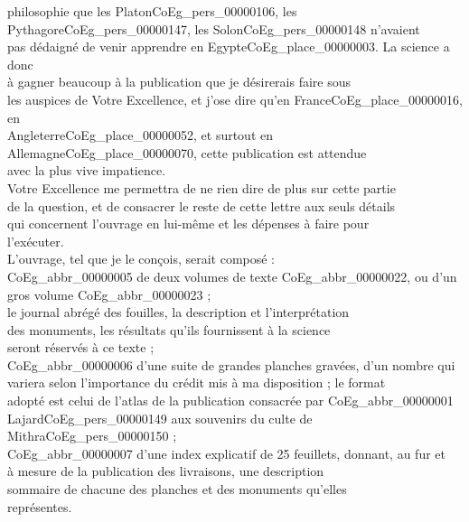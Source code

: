 \documentclass{book}
\begin{document}
philosophie que les Platon\gls{CoEg_pers_00000106}, les Pythagore\gls{CoEg_pers_00000147}, les Solon\gls{CoEg_pers_00000148} n’avaient\\
pas dédaigné de venir apprendre en Egypte\gls{CoEg_place_00000003}. La science a donc\\
à gagner beaucoup à la publication que je désirerais faire sous\\
les auspices de Votre Excellence, et j’ose dire qu’en France\gls{CoEg_place_00000016}, en\\
Angleterre\gls{CoEg_place_00000052}, et surtout en Allemagne\gls{CoEg_place_00000070}, cette publication est attendue\\
avec la plus vive impatience.\\
\indent Votre Excellence me permettra de ne rien dire de plus sur cette partie\\
de la question, et de consacrer le reste de cette lettre aux seuls détails\\
qui concernent l’ouvrage en lui-même et les dépenses à faire pour\\
l’exécuter.\\
\indent L’ouvrage, tel que je le conçois, serait composé :\\
\indent \gls{CoEg_abbr_00000005} de deux volumes de texte \gls{CoEg_abbr_00000022}, ou d’un gros volume \gls{CoEg_abbr_00000023} ;\\
le journal abrégé des fouilles, la description et l’interprétation\\
des monuments, les résultats qu’ils fournissent à la science\\
seront réservés à ce texte ;\\
\indent \gls{CoEg_abbr_00000006} d’une suite de grandes planches gravées, d’un nombre qui\\
variera selon l’importance du crédit mis à ma disposition ; le format\\
adopté est celui de l’atlas de la publication consacrée par \gls{CoEg_abbr_00000001}\\
Lajard\gls{CoEg_pers_00000149} aux souvenirs du culte de Mithra\gls{CoEg_pers_00000150} ;\\
\indent \gls{CoEg_abbr_00000007} d’une index explicatif de 25 feuillets, donnant, au fur et\\
à mesure de la publication des livraisons, une description\\
sommaire de chacune des planches et des monuments qu’elles\\
représentes.\\
\end{document}
